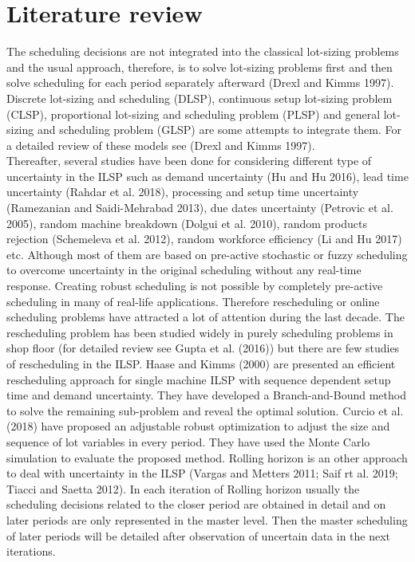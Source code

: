 \documentclass[letterpaper]{article} %
\begin{document}
\section{Literature review}
The scheduling decisions are not integrated into the classical lot-sizing problems and the usual approach, therefore, is to solve lot-sizing problems first and then solve scheduling for each period separately afterward (Drexl and Kimms 1997). Discrete lot-sizing and scheduling (DLSP), continuous setup lot-sizing problem (CLSP), proportional lot-sizing and scheduling problem (PLSP) and general lot-sizing and scheduling problem (GLSP) are some attempts to integrate them. For a detailed review of these models see (Drexl and Kimms 1997).\\
Thereafter, several studies have been done for considering different type of uncertainty in the ILSP such as demand uncertainty (Hu and Hu 2016), lead time uncertainty (Rahdar et al. 2018), processing and setup time uncertainty (Ramezanian and Saidi-Mehrabad 2013), due dates uncertainty (Petrovic et al. 2005), random machine breakdown (Dolgui et al. 2010), random products rejection (Schemeleva et al. 2012), random workforce efficiency (Li and Hu 2017) etc. Although most of them are based on pre-active stochastic or fuzzy scheduling to overcome uncertainty in the original scheduling without any real-time response. Creating robust scheduling  is not possible by completely pre-active scheduling in many of real-life applications. Therefore rescheduling or online scheduling problems have attracted a lot of attention during the last decade. The rescheduling problem has been studied widely in purely scheduling problems in shop floor (for detailed review see Gupta et al. (2016)) but there are few studies of rescheduling in the ILSP. Haase and Kimms (2000) are presented an efficient rescheduling approach for single machine ILSP with sequence dependent setup time and demand uncertainty. They have developed a Branch-and-Bound method to solve the remaining sub-problem and reveal the optimal solution. Curcio et al. (2018) have proposed an adjustable robust optimization to adjust the size and sequence of lot variables in every period. They have used the Monte Carlo simulation to evaluate the proposed method. Rolling horizon is an other approach to deal with uncertainty in the ILSP (Vargas and Metters 2011; Saif rt al. 2019; Tiacci and Saetta 2012). In each iteration of Rolling horizon usually the scheduling decisions related to the closer period are obtained in detail and on later periods are only represented in the master level. Then the master scheduling of later periods will be detailed after observation of uncertain data in the next iterations.
\end{document}

